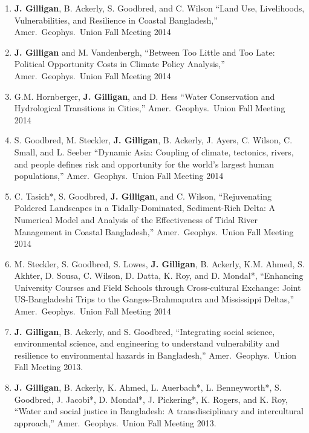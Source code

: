 \begin{enumerate}

    \item \textbf{J. Gilligan}, B. Ackerly, S. Goodbred, and C. Wilson
    \enquote{Land Use, Livelihoods, Vulnerabilities, and Resilience in Coastal Bangladesh,}
    Amer.\ Geophys.\ Union Fall Meeting 2014

    \item \textbf{J. Gilligan} and M. Vandenbergh,    
    \enquote{Between Too Little and Too Late: Political Opportunity Costs in Climate Policy Analysis,}
    Amer.\ Geophys.\ Union Fall Meeting 2014

    \item G.M. Hornberger, \textbf{J. Gilligan}, and D. Hess
    \enquote{Water Conservation and Hydrological Transitions in Cities,}
    Amer.\ Geophys.\ Union Fall Meeting 2014

    \item S. Goodbred, M. Steckler, \textbf{J. Gilligan}, B. Ackerly, J. Ayers, C. Wilson, C. Small, and L. Seeber
    \enquote{Dynamic Asia: Coupling of climate, tectonics, rivers, and people defines risk and opportunity for the world’s largest human populations,}
    Amer.\ Geophys.\ Union Fall Meeting 2014

    \item C. Tasich*, S. Goodbred, \textbf{J. Gilligan}, and C. Wilson,
    \enquote{Rejuvenating Poldered Landscapes in a Tidally-Dominated, Sediment-Rich Delta: A Numerical Model and Analysis of the Effectiveness of Tidal River Management in Coastal Bangladesh,}
    Amer.\ Geophys.\ Union Fall Meeting 2014
    
    \item M. Steckler, S. Goodbred, S. Lowes, \textbf{J. Gilligan}, B. Ackerly, K.M. Ahmed, S. Akhter, D. Sousa, C. Wilson, D. Datta, K. Roy, and D. Mondal*,
    \enquote{Enhancing University Courses and Field Schools through Cross-cultural Exchange: Joint US-Bangladeshi Trips to the Ganges-Brahmaputra and Mississippi Deltas,}
    Amer.\ Geophys.\ Union Fall Meeting 2014

    \item \textbf{J. Gilligan}, B. Ackerly, and S. Goodbred,
    \enquote{Integrating social science, environmental science, and engineering to understand vulnerability and resilience to environmental hazards in Bangladesh,}
    Amer.\ Geophys.\ Union Fall Meeting 2013.
    
    \item \textbf{J. Gilligan}, B. Ackerly, K. Ahmed, L. Auerbach*, L. Benneyworth*, S. Goodbred, J. Jacobi*,  D. Mondal*, J. Pickering*, K. Rogers, and K. Roy,
    \enquote{Water and social justice in Bangladesh: A transdisciplinary and intercultural approach,}
    Amer.\ Geophys.\ Union Fall Meeting 2013.
    

\end{enumerate}
